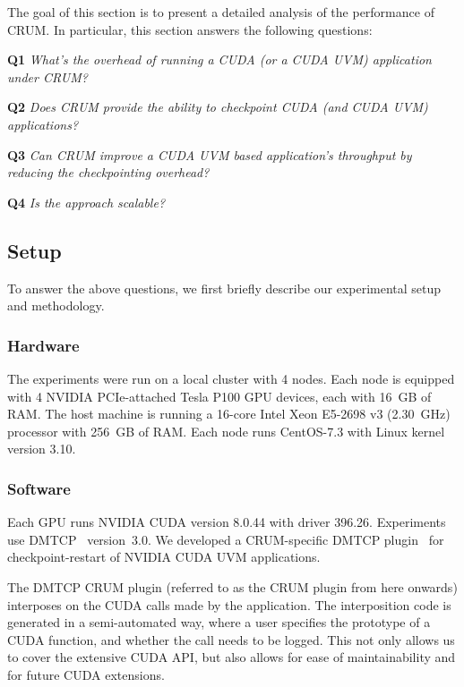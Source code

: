 \documentclass[11pt]{article}
\begin{document}
The goal of this section is to present a detailed analysis of the performance
of CRUM. In particular, this section answers the following questions:

\textbf{Q1} {\itshape What's the overhead of running a CUDA (or a CUDA UVM) application under CRUM?}

\textbf{Q2} {\itshape Does CRUM provide the ability to checkpoint CUDA (and CUDA UVM)
applications?}

\textbf{Q3} {\itshape Can CRUM improve a CUDA UVM based application's throughput by
reducing the checkpointing overhead?}

\textbf{Q4} {\itshape Is the approach scalable?}

\subsection{Setup}

To answer the above questions, we first briefly describe our
experimental setup and methodology.

\subsubsection{Hardware}

The experiments were run on a local cluster with 4 nodes. Each node
is equipped with 4 NVIDIA PCIe-attached Tesla P100 GPU devices, each with 16~GB of RAM. 
The host machine is running a 16-core Intel Xeon E5-2698 v3 (2.30~GHz) processor with 256~GB of RAM. Each node runs CentOS-7.3 with Linux
kernel version 3.10.

\subsubsection{Software}

Each GPU runs NVIDIA CUDA version 8.0.44 with driver 396.26.
Experiments use DMTCP~\cite{ansel2009dmtcp} version~3.0. We developed a
CRUM-specific DMTCP plugin~\cite{arya2016design} for checkpoint-restart of
NVIDIA CUDA UVM applications.

The DMTCP CRUM plugin (referred to as the CRUM plugin from here
onwards) interposes on the CUDA calls made by the application. The
interposition code is generated in a semi-automated way, where a
user specifies the prototype of a CUDA function, and whether the
call needs to be logged. This not only allows us to cover the
extensive CUDA API, but also allows for ease of maintainability and
for future CUDA extensions.
\end{document}
